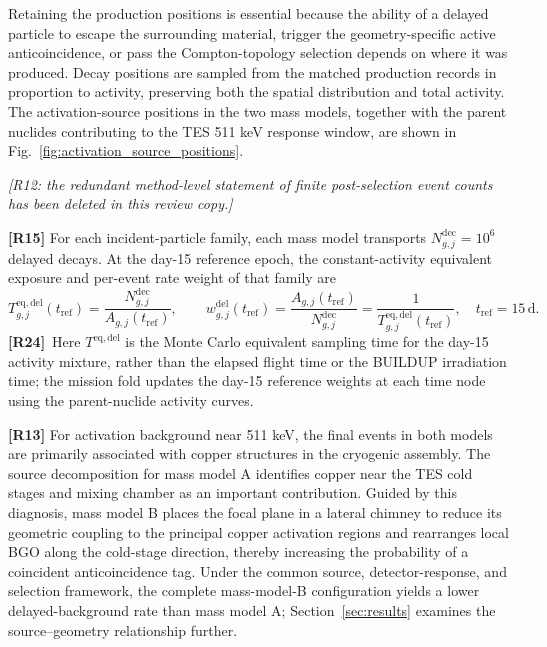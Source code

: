 \documentclass[11pt]{article}
\newcommand{\revmark}[1]{\textcolor{revisionblue}{\textbf{[R#1]}}\ }
\newcommand{\revdeleted}[1]{\par\noindent\textcolor{revisionblue}{\small\itshape [#1]}\par}
\begin{document}
Retaining the production positions is essential because the ability of a
delayed particle to escape the surrounding material, trigger the
geometry-specific active anticoincidence, or pass the Compton-topology
selection depends on where it was produced. Decay positions are sampled from
the matched production records in proportion to activity, preserving both the
spatial distribution and total activity. The activation-source positions in
the two mass models, together with the parent nuclides contributing to the TES
511 keV response window, are shown in
Fig.~\ref{fig:activation_source_positions}.
\endgroup

\revdeleted{R12: the redundant method-level statement of finite post-selection event counts has been deleted in this review copy.}

\begingroup
\color{revisionblue}
\noindent\textbf{[R15]} For each incident-particle family, each mass model
transports $N^{\mathrm{dec}}_{g,j}=10^6$ delayed decays. At the day-15 reference
epoch, the constant-activity equivalent exposure and per-event rate weight of
that family are
\begin{equation}
 T^{\mathrm{eq,del}}_{g,j}(t_{\mathrm{ref}})
 =\frac{N^{\mathrm{dec}}_{g,j}}{A_{g,j}(t_{\mathrm{ref}})},
 \qquad
 w^{\mathrm{del}}_{g,j}(t_{\mathrm{ref}})
 =\frac{A_{g,j}(t_{\mathrm{ref}})}{N^{\mathrm{dec}}_{g,j}}
 =\frac{1}{T^{\mathrm{eq,del}}_{g,j}(t_{\mathrm{ref}})},
 \quad t_{\mathrm{ref}}=15\,\mathrm{d}.
 \label{eq:delayed_equivalent_exposure}
\end{equation}
\revmark{24}Here $T^{\mathrm{eq,del}}$ is the Monte Carlo equivalent sampling time for the
day-15 activity mixture, rather than the elapsed flight time or the BUILDUP
irradiation time; the mission fold updates the day-15 reference weights at each
time node using the parent-nuclide activity curves.
\endgroup

\begingroup
\color{revisionblue}
\noindent\textbf{[R13]} For activation background near 511 keV, the final
events in both models are primarily associated with copper structures in the
cryogenic assembly. The source decomposition for mass model A identifies
copper near the TES cold stages and mixing chamber as an important
contribution. Guided by this diagnosis, mass model B places the focal plane in
a lateral chimney to reduce its geometric coupling to the principal copper
activation regions and rearranges local BGO along the cold-stage direction,
thereby increasing the probability of a coincident anticoincidence tag. Under
the common source, detector-response, and selection framework, the complete
mass-model-B configuration yields a lower delayed-background rate than mass
model A; Section~\ref{sec:results} examines the source--geometry relationship
further.
\endgroup
\end{document}
